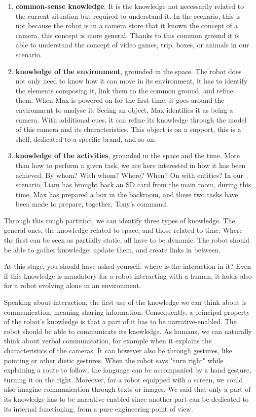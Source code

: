 \begin{enumerate}
  \item \textbf{common-sense knowledge}. It is the knowledge not necessarily related to the current situation but required to understand it. In the scenario, this is not because the robot is in a camera store that it known the concept of a camera, this concept is more general. Thanks to this common ground it is able to understand the concept of video games, trip, boxes, or animals in our scenario.
  \item \textbf{knowledge of the environment}, grounded in the space. The robot does not only need to know how it can move in its environment, it has to identify the elements composing it, link them to the common ground, and refine them. When Max is powered on for the first time, it goes around the environment to analyse it. Seeing an object, Max identifies it as being a camera. With additional cues, it can refine its knowledge through the model of this camera and its characteristics. This object is on a support, this is a shelf, dedicated to a specific brand, and so on.
  \item \textbf{knowledge of the activities}, grounded in the space and the time. More than how to perform a given task, we are here interested in how it has been achieved. By whom? With whom? Where? When? On with entities? In our scenario, Liam has brought back an SD card from the main room, during this time, Max has prepared a box in the backroom, and these two tasks have been made to prepare, together, Tony's command.
\end{enumerate}

Through this rough partition, we can identify three types of knowledge. The general ones, the knowledge related to space, and those related to time. Where the first can be seen as partially static, all have to be dynamic. The robot should be able to gather knowledge, update them, and create links in between.

At this stage, you should have asked yourself: where is the interaction in it? Even if this knowledge is mandatory for a robot interacting with a human, it holds also for a robot evolving alone in an environment.

Speaking about interaction, the first use of the knowledge we can think about is communication, meaning sharing information. Consequently, a principal property of the robot's knowledge is that a part of it has to be narrative-enabled. The robot should be able to communicate its knowledge. As humans, we can naturally think about verbal communication, for example when it explains the characteristics of the cameras. It can however also be through gestures, like pointing or other dietic gestures. When the robot says "turn right" while explaining a route to follow, the language can be accompanied by a hand gesture, turning it on the right. Moreover, for a robot equipped with a screen, we could also imagine communication through texts or images. We said that only a part of its knowledge has to be narrative-enabled since another part can be dedicated to its internal functioning, from a pure engineering point of view.

